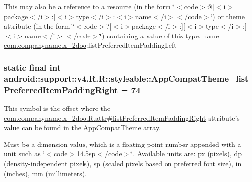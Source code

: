 This may also be a reference to a resource (in the form \char`\"{}$<$code$>$@\mbox{[}$<$i$>$package$<$/i$>$:\mbox{]}$<$i$>$type$<$/i$>$:$<$i$>$name$<$/i$>$$<$/code$>$\char`\"{}) or theme attribute (in the form \char`\"{}$<$code$>$?\mbox{[}$<$i$>$package$<$/i$>$:\mbox{]}\mbox{[}$<$i$>$type$<$/i$>$:\mbox{]}$<$i$>$name$<$/i$>$$<$/code$>$\char`\"{}) containing a value of this type.  name \hyperlink{namespacecom_1_1companyname_1_1x__2doo}{com.companyname.x\_\-2doo}:listPreferredItemPaddingLeft \hypertarget{classandroid_1_1support_1_1v4_1_1_r_1_1styleable_265ab9cd877ed88fe04ba61fc41703e3}{
\subsubsection[{AppCompatTheme\_\-listPreferredItemPaddingRight}]{\setlength{\rightskip}{0pt plus 5cm}static final int android::support::v4.R.R::styleable::AppCompatTheme\_\-listPreferredItemPaddingRight = 74}}
\label{classandroid_1_1support_1_1v4_1_1_r_1_1styleable_265ab9cd877ed88fe04ba61fc41703e3}


This symbol is the offset where the \hyperlink{classcom_1_1companyname_1_1x__2doo_1_1_r_1_1attr_efcdf1ac2477c858ee7afc979714d867}{com.companyname.x\_\-2doo.R.attr\#listPreferredItemPaddingRight} attribute's value can be found in the \hyperlink{classandroid_1_1support_1_1v4_1_1_r_1_1styleable_0873e92ba21076bb5a4aeadeb7f5779f}{AppCompatTheme} array.

Must be a dimension value, which is a floating point number appended with a unit such as \char`\"{}$<$code$>$14.5sp$<$/code$>$\char`\"{}. Available units are: px (pixels), dp (density-independent pixels), sp (scaled pixels based on preferred font size), in (inches), mm (millimeters). 

